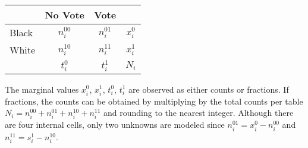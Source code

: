 \begin{table}[!h]
  \begin{center}
    \begin{tabular}{l|cc|c}
      & No Vote  & Vote &         \\
      \hline
      Black & $n_i^{00}$  & $n_i^{01}$ & $x_i^0$   \\
      White & $n_i^{10}$  & $n_i^{11}$ & $x_i^1$ \\
      \hline
      & $t_i^0$ & $t_i^1$ & $N_i$         
    \end{tabular}
  \end{center}
\end{table}

\noindent The marginal values $x_{i}^0$, $x_{i}^1$, $t_i^0$,
$t_i^1$ are observed as either counts or fractions. If fractions, the
counts can be obtained by multiplying by the total counts per table
$N_i = n_i^{00} + n_i^{01} + n_i^{10} + n_i^{11}$ and rounding to the
nearest integer.  Although there are four internal cells, only two
unknowns are modeled since $n_i^{01} = x_i^0 - n_{i}^{00}$ and
$n_{i}^{11} = s_i^1 - n_{i}^{10}$.

